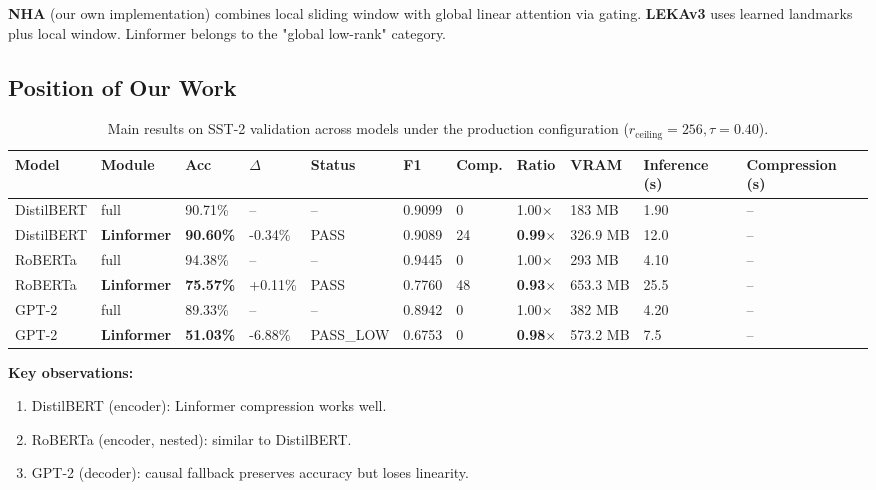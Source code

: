 \textbf{NHA} (our own implementation) combines local sliding window with global 
linear attention via gating. \textbf{LEKAv3} uses learned landmarks plus local 
window. Linformer belongs to the "global low-rank" category.

\subsection{Position of Our Work}

\begin{table}[t]
\centering
\small
\begin{tabular}{lllllllllll}
\toprule
\textbf{Model} & \textbf{Module} & \textbf{Acc} & \textbf{$\Delta$} & \textbf{Status} & \textbf{F1} & \textbf{Comp.} & \textbf{Ratio} & \textbf{VRAM} & \textbf{Inference (s)} & \textbf{Compression (s)} \\
\midrule
DistilBERT & full & 90.71\% & -- & -- & 0.9099 & 0 & 1.00$\times$ & 183 MB & 1.90 & -- \\
DistilBERT & \textbf{Linformer} & \textbf{90.60\%} & -0.34\% & PASS & 0.9089 & 24 & \textbf{0.99$\times$} & 326.9 MB & 12.0 & -- \\
RoBERTa & full & 94.38\% & -- & -- & 0.9445 & 0 & 1.00$\times$ & 293 MB & 4.10 & -- \\
RoBERTa & \textbf{Linformer} & \textbf{75.57\%} & +0.11\% & PASS & 0.7760 & 48 & \textbf{0.93$\times$} & 653.3 MB & 25.5 & -- \\
GPT-2 & full & 89.33\% & -- & -- & 0.8942 & 0 & 1.00$\times$ & 382 MB & 4.20 & -- \\
GPT-2 & \textbf{Linformer} & \textbf{51.03\%} & -6.88\% & PASS_LOW & 0.6753 & 0 & \textbf{0.98$\times$} & 573.2 MB & 7.5 & -- \\
\bottomrule
\end{tabular}
\caption{Main results on SST-2 validation across models under the production configuration ($r_{\mathrm{ceiling}}=256, \tau=0.40$).}
\label{tab:main_sst2}
\end{table}

\textbf{Key observations:}

\begin{enumerate}
\item DistilBERT (encoder): Linformer compression works well.
\item RoBERTa (encoder, nested): similar to DistilBERT.
\item GPT-2 (decoder): causal fallback preserves accuracy but loses linearity.

\end{enumerate}
